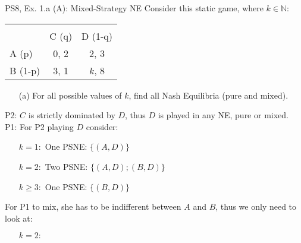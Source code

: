 \begin{frame}{PS8, Ex. 1.a (A): Mixed-Strategy NE}
      Consider this static game, where $k\in\mathbb{N}:$
      \vspace{-16pt}
      \begin{table}
        \begin{tabular}{l|c|c|}
          \multicolumn{1}{c}{} & \multicolumn{2}{c}{} \\
          \multicolumn{1}{c}{} & \multicolumn{1}{c}{C (q)} & \multicolumn{1}{c}{\color{blue}D (1-q)} \\\cline{2-3}
          A (p)   & 0, 2 & 2, \color{blue}3 \\\cline{2-3}
          B (1-p) & 3, 1 & $k$, \color{blue}8 \\\cline{2-3}
        \end{tabular}
      \end{table}
      \begin{itemize}
        \item[(a)] For all possible values of $k$, find all Nash Equilibria (pure and mixed).
      \end{itemize}
      P2: $C$ is strictly dominated by $D$, thus $D$ is played in any NE, pure or mixed.\\\medskip
      P1: For P2 playing $D$ consider:
      \begin{itemize}
        \item[$k=1:$] One PSNE: $\{(A,D)\}$
        \item[$k=2:$] Two PSNE: $\{(A,D);(B,D)\}$
        \item[$k\geq3:$] One PSNE: $\{(B,D)\}$
      \end{itemize}
      For P1 to mix, she has to be indifferent between $A$ and $B$, thus we only need to look at:
      \begin{itemize}
        \item[$k=2:$]
      \end{itemize}
      \vfill\null
\end{frame}
